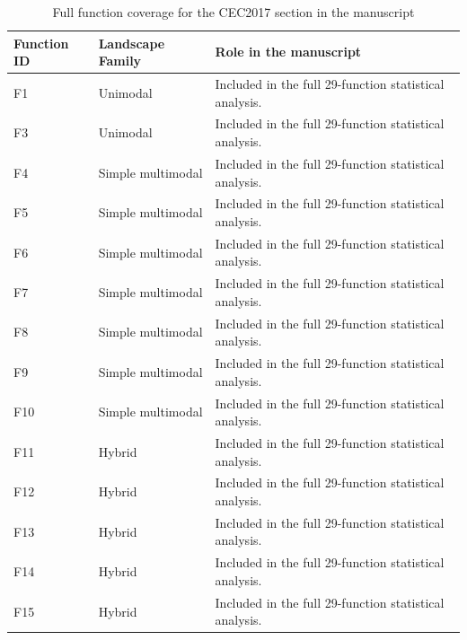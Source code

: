 \documentclass[11pt]{article}
\begin{document}
\begin{table}[htbp]
\centering
\caption{Full function coverage for the CEC2017 section in the manuscript}\label{tab:s1_coverage}
\begin{tabular}{>{\RaggedRight\arraybackslash}p{} >{\RaggedRight\arraybackslash}p{} >{\RaggedRight\arraybackslash}p{}}
\toprule
\textbf{Function ID} & \textbf{Landscape Family} & \textbf{Role in the manuscript} \\
\midrule
F1 & Unimodal & Included in the full 29-function statistical analysis. \\
F3 & Unimodal & Included in the full 29-function statistical analysis. \\
F4 & Simple multimodal & Included in the full 29-function statistical analysis. \\
F5 & Simple multimodal & Included in the full 29-function statistical analysis. \\
F6 & Simple multimodal & Included in the full 29-function statistical analysis. \\
F7 & Simple multimodal & Included in the full 29-function statistical analysis. \\
F8 & Simple multimodal & Included in the full 29-function statistical analysis. \\
F9 & Simple multimodal & Included in the full 29-function statistical analysis. \\
F10 & Simple multimodal & Included in the full 29-function statistical analysis. \\
F11 & Hybrid & Included in the full 29-function statistical analysis. \\
F12 & Hybrid & Included in the full 29-function statistical analysis. \\
F13 & Hybrid & Included in the full 29-function statistical analysis. \\
F14 & Hybrid & Included in the full 29-function statistical analysis. \\
F15 & Hybrid & Included in the full 29-function statistical analysis. \\
\bottomrule
\end{tabular}
\end{table}
\end{document}
